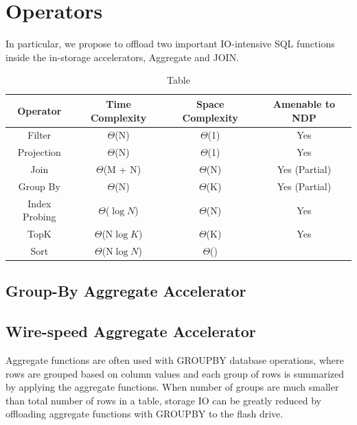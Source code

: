 \documentclass{article}
\begin{document}
\section{Operators}

In particular, we propose to offload two important IO-intensive SQL functions inside the in-storage accelerators, Aggregate and JOIN.



\begin{table}
\centering 
\begin{tabular}{ |c|c|c|c| } 
 \hline
 Operator       & Time Complexity & Space Complexity  & Amenable to NDP \\ \hline
 Filter         & $\Theta$(N)     & $\Theta$(1)       & Yes             \\ \hline
 Projection     & $\Theta$(N)     & $\Theta$(1)       & Yes             \\ \hline
 Join           & $\Theta$(M + N) & $\Theta$(N)       & Yes (Partial)   \\ \hline
 Group By       & $\Theta$(N)     & $\Theta$(K)       & Yes (Partial)   \\ \hline
 Index Probing  & $\Theta$($\log{N}$) & $\Theta$(N)   & Yes             \\ \hline
 TopK           & $\Theta$(N$\log{K}$) & $\Theta$(K)  & Yes             \\ \hline
 Sort           & $\Theta$(N$\log{N}$) & $\Theta$()   & \\

 \hline
\end{tabular}
\caption{Table}
\end{table}


\subsection{Group-By Aggregate Accelerator}
\subsection{Wire-speed Aggregate Accelerator}

Aggregate functions are often used with GROUPBY database operations, where rows are grouped based on column values and each group of rows is summarized by applying the aggregate functions.
When number of groups are much smaller than total number of rows in a table, storage IO can be greatly reduced by offloading aggregate functions with GROUPBY to the flash drive.
\end{document}
